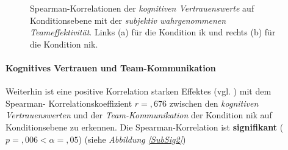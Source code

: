 \documentclass[a4paper,11pt]{article}%
\renewcommand{\\}{\vspace*{0.5\baselineskip} \newline}
\begin{document}
{\begin{figure}[h]
  \centering
  \qquad
  \caption[Spearman-Korrelation kog. Vert. NIK und wahrg. Teameffektivität NIK]{Spearman-Korrelationen der \textit{kognitiven Vertrauenswerte} auf Konditionsebene mit der \textit{subjektiv wahrgenommenen Teameffektivität}. Links (a) für die Kondition \ac{ik} und rechts (b) für die Kondition \ac{nik}.}
  \label{SubSig1}
\end{figure}

\paragraph{Kognitives Vertrauen und  Team-Kommunikation}
\label{WACTTC}
Weiterhin ist eine positive Korrelation starken Effektes (vgl. \citep[S. 77-81]{cohen2013statistical}) mit dem Spearman- Korrelationskoeffizient $r =,676$ zwischen den \textit{kognitiven Vertrauenswerten} und der \textit{Team-Kommunikation} der Kondition \ac{nik} auf Konditionsebene zu erkennen. Die Spearman-Korrelation ist \textbf{signifikant} ($p =,006 < \alpha = ,05$) (siehe \textit{Abbildung \ref{SubSig2}})\\

}
\end{document}
